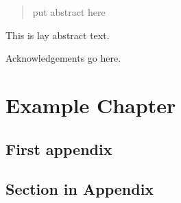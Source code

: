\begin{abstract} %

put abstract here
  
  \lipsum[1-2]
\end{abstract}%
\clearpage



\begin{uomlay} %
  This is lay abstract text. 
  
  \lipsum[1-2]
\end{uomlay}



\uomdeclarations %






\begin{uomacknowledgements} %
Acknowledgements go here.
\end{uomacknowledgements}

\chapter{Example Chapter} 



\printbibliography[title={References},heading=bibintoc] %



\begin{uomappendix} 
  \chapter{First appendix}
    \section{Section in Appendix}
    \lipsum[1-6]
\end{uomappendix}


